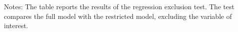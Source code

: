 \begin{table}[]
\centering
\caption{Regression Exclusion Test}
\label{tab:exclusion_test}
\begin{tablenotes}
    \small
    \item Notes: The table reports the results of the regression exclusion test. The test compares the full model with the restricted model, excluding the variable of interest.
    \end{tablenotes}
\end{table}

\clearpage
